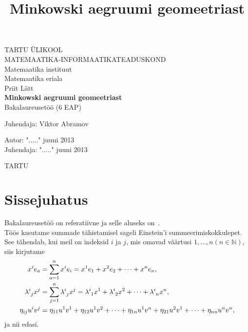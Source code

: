 \documentclass[a4paper,12pt]{article}
\title{Minkowski aegruumi geomeetriast}
\theoremstyle{plain}
\theoremstyle{definition}
\numberwithin{equation}{section}
\begin{document}
\begin{titlepage}
\begin{center}

{\large TARTU ÜLIKOOL}\\[0.3cm]
{\large MATEMAATIKA-INFORMAATIKATEADUSKOND}\\[0.3cm]
{\large Matemaatika instituut}\\[0.3cm]
{\large Matemaatika eriala}\\[3cm]

{\large Priit Lätt}\\[0.3cm]
{\huge \textbf{Minkowski aegruumi geomeetriast}}\\[0.3cm]
{\large Bakalaureusetöö (6 EAP)}\\[3cm]

\begin{flushright}
{\large Juhendaja: Viktor Abramov}
\end{flushright}

\vfill

\begin{flushleft}
{\large
Autor: \dotfill "....." juuni 2013\\
Juhendaja: \dotfill "....." juuni 2013\\[2cm]
}
\end{flushleft}
{\large TARTU \the\year}

\end{center}
\end{titlepage}

\tableofcontents
\newpage

\section{Sissejuhatus}

Bakalaureusetöö on referatiivne ja selle aluseks on~\cite{Naber}. \\
Töös kasutame summade tähistamisel sageli Einstein'i summeerimiskokkulepet. See tähendab, kui meil on indeksid $i$ ja $j$, mis omavad väärtusi $1, \dots, n \left( n \in \mathbb{N} \right)$, siis kirjutame 
\begin{align*}
x^{i} e_{a} &= \sum_{a=1}^{n} x^{i} e_{i} = x^{1} e_{1} + x^{2} e_{2} + \dots + x^{n} e_{n}, \\
\lambda\indices{^i_j} x^{j} &= \sum_{j=1}^{n} \lambda\indices{^i_j} x^{j} = \lambda\indices{^i_1} x^{1} + \lambda\indices{^i_2} x^{2} + \dots +\lambda\indices{^i_n} x^{n},\\
\eta_{ij} u^{i} v^{j} &= \eta_{11} u^{1} v^{1} + \eta_{12} u^{1} v^{2} + \dots + \eta_{1n} u^{1} v^{n} + \eta_{21} u^{2} v^{1} + \dots + \eta_{nn} u^{n} v^{n},
\end{align*}
ja nii edasi.
\end{document}
